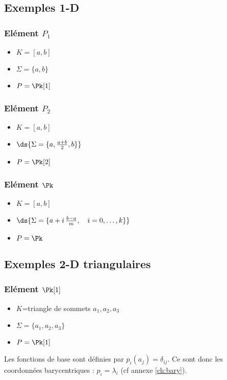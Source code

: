 \subsection{Exemples 1-D}
\label{par:ex1d}
%
\subsubsection{Elément $P_1$}
\begin{itemize}
\item $K=[a,b]$
\item $\Sigma=\{a,b\}$
\item $P=\Pk[1]$
\end{itemize}
%
\subsubsection{Elément $P_2$}
\begin{itemize}
\item $K=[a,b]$
\item $\ds{\Sigma=\{a,\frac{a+b}{2},b\}}$
\item $P=\Pk[2]$
\end{itemize}
%
%
\subsubsection{Elément $\Pk$}
\begin{itemize}
\item $K=[a,b]$
\item $\ds{\Sigma=\{a+i\,\frac{b-a}{m},\quad i=0,\ldots,k\}}$
\item $P=\Pk$
\end{itemize}
%
%
\subsection{Exemples 2-D triangulaires}
%
%
\subsubsection{Elément $\Pk[1]$}
\begin{itemize}
\item $K$=triangle de sommets $a_1, a_2, a_3$
\item $\Sigma=\{a_1,a_2,a_3\}$
\item $P=\Pk[1]$
\end{itemize}
%
Les fonctions de base sont définies par $p_i(a_j)=\delta_{ij}$. Ce sont donc
les coordonnées barycentriques : $p_i=\lambda_i$ (cf annexe \ref{ch:bary}).
%
%
